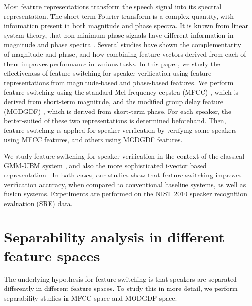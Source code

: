 \documentclass{article}
\begin{document}
Most feature representations transform the speech signal into its spectral
representation. The short-term Fourier transform is a complex quantity, with
information present in both magnitude and phase spectra. It is known from linear
system theory, that non minimum-phase signals have different information in
magnitude and phase spectra \cite{oppenheim}. Several studies \cite{mgd_complement}
have shown the complementarity of magnitude and phase, and how combining feature
vectors derived from each of them improves performance in various tasks. In this
paper, we study the effectiveness of feature-switching for speaker verification
using feature representations from magnitude-based and phase-based features. We
perform feature-switching using the standard Mel-frequency cepstra (MFCC)
\cite{mfcc}, which is derived from short-term magnitude, and the modified group delay feature
(MODGDF) \cite{hegdeModgdf}, which is derived from short-term phase. For each speaker, the
better-suited of these two representations is determined beforehand. Then,
feature-switching is applied for speaker verification by verifying some speakers
using MFCC features, and others using MODGDF features.

We study feature-switching for speaker verification in the context of the
classical GMM-UBM system \cite{reynoldsAdaptedGMM}, and also the more
sophisticated i-vector based representation \cite{dehak_ivector}. In both cases,
our studies show that feature-switching improves verification accuracy, when compared to
conventional baseline systems, as well as fusion systems. Experiments are performed on the
NIST 2010 speaker recognition evaluation (SRE) \cite{nist2010SRE} data.



\section{Separability analysis in different feature spaces}
\label{sec:separability}
The underlying hypothesis for feature-switching is that speakers are separated
differently in different feature spaces. To study this in more detail, we
perform separability studies in MFCC space and MODGDF space.
\end{document}
